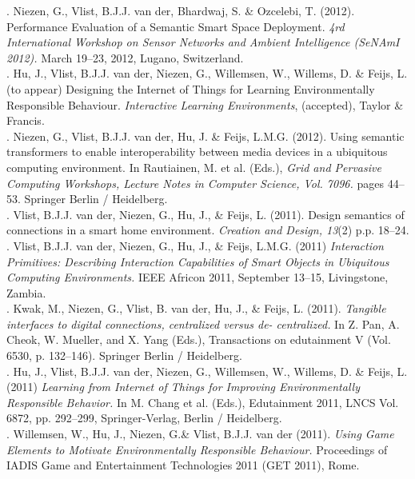 . Niezen, G., Vlist, B.J.J. van der, Bhardwaj, S. \& Ozcelebi, T. (2012). Performance Evaluation of a Semantic Smart Space Deployment. \emph{4rd International Workshop on Sensor Networks and Ambient Intelligence (SeNAmI 2012).} March 19--23, 2012, Lugano, Switzerland.\\

. Hu, J., Vlist, B.J.J. van der, Niezen, G., Willemsen, W., Willems, D. \& Feijs, L. (to appear) Designing the Internet of Things for Learning Environmentally Responsible Behaviour. \emph{Interactive Learning Environments}, (accepted), Taylor \& Francis.\\

. Niezen, G., Vlist, B.J.J. van der, Hu, J. \& Feijs, L.M.G. (2012). Using semantic transformers to enable interoperability between media devices in a ubiquitous computing environment. In Rautiainen, M. et al. (Eds.), \emph{Grid and Pervasive Computing Workshops, Lecture Notes in Computer Science, Vol. 7096.} pages 44--53. Springer Berlin / Heidelberg.\\

. Vlist, B.J.J. van der, Niezen, G., Hu, J., \& Feijs, L. (2011). Design semantics of connections in a smart home environment. \emph{Creation and Design, 13}(2) p.p. 18--24.\\

. Vlist, B.J.J. van der, Niezen, G., Hu, J., \& Feijs, L.M.G. (2011) \emph{Interaction Primitives: Describing Interaction Capabilities of Smart Objects in Ubiquitous Computing Environments.} IEEE Africon 2011, September 13--15, Livingstone, Zambia.\\

. Kwak, M., Niezen, G., Vlist, B. van der, Hu, J., \& Feijs, L. (2011). \emph{Tangible interfaces to digital connections, centralized versus de- centralized.} In Z. Pan, A. Cheok, W. Mueller, and X. Yang (Eds.), Transactions on edutainment V (Vol. 6530, p. 132--146). Springer Berlin / Heidelberg.\\

. Hu, J., Vlist, B.J.J. van der, Niezen, G., Willemsen, W., Willems, D. \& Feijs, L. (2011) \emph{ Learning from Internet of Things for Improving Environmentally Responsible Behavior.} In M. Chang et al. (Eds.), Edutainment 2011, LNCS Vol. 6872, pp. 292--299, Springer-Verlag, Berlin / Heidelberg.\\

. Willemsen, W., Hu, J., Niezen, G.\& Vlist, B.J.J. van der (2011). \emph{Using Game Elements to Motivate Environmentally Responsible Behaviour.} Proceedings of IADIS Game and Entertainment Technologies 2011 (GET 2011), Rome.\\


